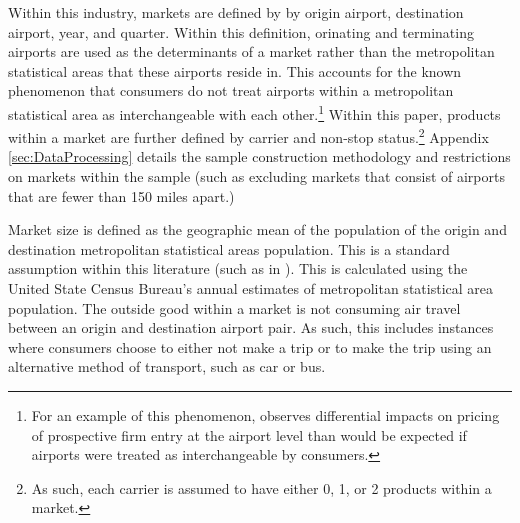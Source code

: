 \documentclass{article}
\begin{document}
	 Within this industry, markets are defined by by origin airport, destination airport, year, and quarter. Within this definition, orinating and terminating airports are used as the determinants of a market rather than the metropolitan statistical areas that these airports reside in. This accounts for the known phenomenon that consumers do not treat airports within a metropolitan statistical area as interchangeable with each other.\footnote{For an example of this phenomenon, \citet{goolsbee_how_2008} observes differential impacts on pricing of prospective firm entry at the airport level than would be expected if airports were treated as interchangeable by consumers.} Within this paper, products within a market are further defined by carrier and non-stop status.\footnote{As such, each carrier is assumed to have either 0, 1, or 2 products within a market.} Appendix \ref{sec:DataProcessing} details the sample construction methodology and restrictions on markets within the sample (such as excluding markets that consist of airports that are fewer than 150 miles apart.)
	
	Market size is defined as the geographic mean of the population of the origin and destination metropolitan statistical areas population. This is a standard assumption within this literature (such as in \citep{ciliberto_market_2021}). This is calculated using the United State Census Bureau's annual estimates of metropolitan statistical area population. The outside good within a market is not consuming air travel between an origin and destination airport pair. As such, this includes instances where consumers choose to either not make a trip or to make the trip using an alternative method of transport, such as car or bus. 

    
	
	
\end{document}
